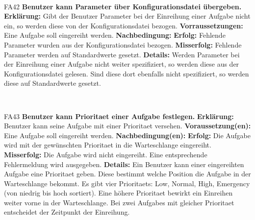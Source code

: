 \documentclass[a4paper,12pt]{article}
\begin{document}
\begin{itemize}[nosep]
\begin{minipage}[t]{\linewidth}
	\end{minipage}
	\newline
	\\
	
	\begin{minipage}[t]{\linewidth}
		\item[FA42] \textbf{Benutzer kann \gls{Parameter} über \gls{Konfigurationsdatei} übergeben.}
		\subitem \textbf{Erklärung:} Gibt der \gls{Benutzer} \gls{Parameter} bei der Einreihung einer \gls{Aufgabe} nicht ein, so werden diese von der \gls{Konfigurationsdatei} bezogen.
		\subitem \textbf{Vorraussetzungen:} Eine \gls{Aufgabe} soll eingereiht werden.
		\subitem \textbf{Nachbedingung:}
		\subsubitem \textbf{Erfolg:} Fehlende \gls{Parameter} wurden aus der \gls{Konfigurationsdatei} bezogen.
		\subsubitem \textbf{Misserfolg:} Fehlende \gls{Parameter} werden auf Standardwerte gesetzt.
		\subitem \textbf{Details:} Werden \gls{Parameter} bei der Einreihung einer \gls{Aufgabe} nicht weiter spezifiziert, so werden diese aus der \gls{Konfigurationsdatei} gelesen. Sind diese dort ebenfalls nicht spezifiziert, so werden diese auf Standardwerte gesetzt.
	\end{minipage}
	\newline
	\\
	
	\begin{minipage}[t]{\linewidth}
		\item[FA43] \textbf{Benutzer kann \gls{Prioritaet} einer \gls{Aufgabe} festlegen.}
		\subitem \textbf{Erklärung:} \gls{Benutzer} kann seine \gls{Aufgabe} mit einer \gls{Prioritaet} versehen.
		\subitem \textbf{Voraussetzung(en):} Eine \gls{Aufgabe} soll eingereiht werden.
		\subitem \textbf{Nachbedingung(en):}
		\subsubitem \textbf{Erfolg:} Die \gls{Aufgabe} wird mit der gewünschten \gls{Prioritaet} in die \gls{Warteschlange} eingereiht.
		\subsubitem \textbf{Misserfolg:} Die \gls{Aufgabe} wird nicht eingereiht. Eine entsprechende Fehlermeldung wird ausgegeben.
		\subitem \textbf{Details:} Ein \gls{Benutzer} kann einer eingereihten \gls{Aufgabe} eine \gls{Prioritaet} geben. Diese bestimmt welche Position die \gls{Aufgabe} in der \gls{Warteschlange} bekommt. Es gibt vier \glspl{Prioritaet}: Low, Normal, High, Emergency (von niedrig bis hoch sortiert). Eine höhere \gls{Prioritaet} bewirkt ein Einreihen weiter vorne in der \gls{Warteschlange}. Bei zwei \glspl{Aufgabe} mit gleicher \gls{Prioritaet} entscheidet der Zeitpunkt der Einreihung.
    \end{minipage}	
	\newline
	\\
	

\end{itemize}
\end{document}
